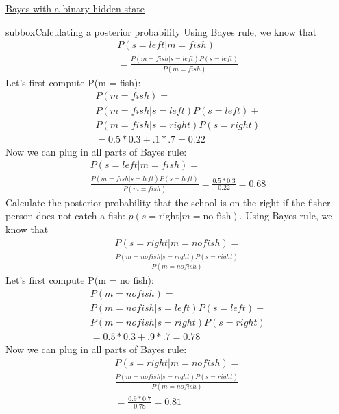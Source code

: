 \begin{textbox}{\href{https://compneuro.neuromatch.io/tutorials/W3D1_BayesianDecisions/student/W3D1_Tutorial1.html}{Bayes with a binary hidden state } }
\begin{subbox}{subbox}{Calculating a posterior probability
}
Using Bayes rule, we know that 
\begin{eqnarray*}   
P(s = left | m = fish) \\ 
 = \frac{P(m = fish | s = left)P(s = left)}{P(m = fish)}
            \end{eqnarray*}
Let's first compute P(m = fish):
\begin{eqnarray*}   
   P(m = fish) =  \\
   P(m = fish | s = left)P(s = left) + \\ P(m = fish | s = right)P(s = right)\\
               = 0.5 * 0.3 + .1 * .7
               = 0.22
                \end{eqnarray*}
   Now we can plug in all parts of Bayes rule:
\begin{eqnarray*}     P(s = left | m = fish) =\\
\frac{P(m = fish | s = left)P(s = left) }{ P(m = fish)}
                          = \frac{0.5 * 0.3 }{ 0.22}
                          = 0.68
                          \end{eqnarray*}
Calculate the posterior probability that the school is on the right if the fisher-person does not catch a fish: $p(s = \textrm{right} | m = \textrm{no fish})$. Using Bayes rule, we know that 
\begin{eqnarray*} P(s = right | m = no fish) =\\ \frac{P(m = no fish | s = right)P(s = right) }{ P(m = no fish)}\end{eqnarray*} 
   Let's first compute P(m = no fish):
\begin{eqnarray*}    P(m = no fish) = \\P(m = no fish | s = left)P(s = left) +  \\P(m = no fish | s = right)P(s = right)\\
                  = 0.5 * 0.3 + .9 * .7
                  = 0.78
                  \end{eqnarray*} 
   Now we can plug in all parts of Bayes rule:
 \begin{eqnarray*}    P(s = right | m = no fish) = \\
 \frac{P(m = no fish | s = right)P(s = right) }{ P(m = no fish)}\\
                              = \frac{0.9 * 0.7 }{ 0.78}
                              = 0.81
\end{eqnarray*}  
\end{subbox}

\end{textbox}
